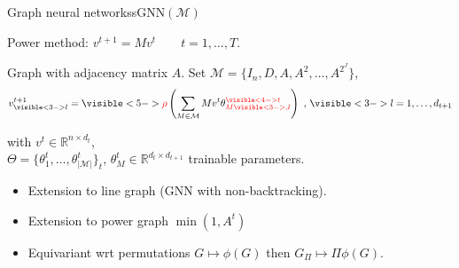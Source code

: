 \documentclass{beamer}
\begin{document}
\begin{frame}{Graph neural networks}{sGNN$(\mathcal M)$}

Power method: $v^{t+1} = Mv^t \quad \quad t=1,\ldots, T$.

\pause
\smallskip
Graph with adjacency matrix $A$. Set $\mathcal M=\{I_n, D, A, A^2,\ldots, A^{2^J}\}$,
\begin{equation*}
v^{t+1}_{\visible<3->l} = \visible<5->{\color{red}\rho \color{black}} \left( \sum_{M \in \mathcal{M}}  M v^{t} \theta_{M\visible<3->{\color{red},l}}^{\color{red}\visible<4->t}  \right) ~,\, \visible<3->{l=1,\dots ,d_{t+1}} %
\end{equation*}

with $v^t\in \mathbb R^{n\times d_t}$, \\
$\Theta=\{ \theta_1^t, \dots, \theta_{|\mathcal{M}|}^{t} \}_t$, 
${\theta}_M^{t} \in \mathbb{R}^{d_t \times d_{t+1}}$ trainable parameters. 

\bigskip

\begin{itemize}
\item<6-> Extension to line graph (GNN with non-backtracking).
\item<6-> Extension to power graph $\min (1, A^t)$
\item<7-> Equivariant wrt permutations $G \mapsto \phi(G)$ then $G_\Pi \mapsto \Pi \phi(G)$.
\end{itemize}

\let\thefootnote\relax{}
\let\thefootnote\relax{}

\end{frame}
\end{document}
